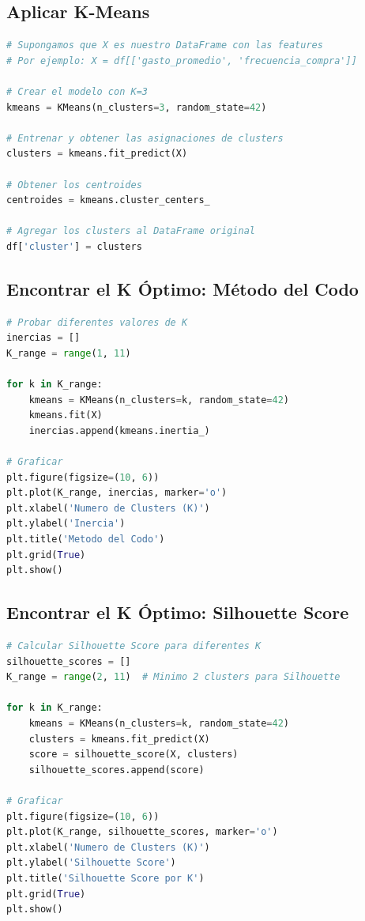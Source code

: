 \documentclass[12pt]{article}
\begin{document}
\subsection{Aplicar K-Means}

\begin{lstlisting}[language=Python]
# Supongamos que X es nuestro DataFrame con las features
# Por ejemplo: X = df[['gasto_promedio', 'frecuencia_compra']]

# Crear el modelo con K=3
kmeans = KMeans(n_clusters=3, random_state=42)

# Entrenar y obtener las asignaciones de clusters
clusters = kmeans.fit_predict(X)

# Obtener los centroides
centroides = kmeans.cluster_centers_

# Agregar los clusters al DataFrame original
df['cluster'] = clusters
\end{lstlisting}

\subsection{Encontrar el K Óptimo: Método del Codo}

\begin{lstlisting}[language=Python]
# Probar diferentes valores de K
inercias = []
K_range = range(1, 11)

for k in K_range:
    kmeans = KMeans(n_clusters=k, random_state=42)
    kmeans.fit(X)
    inercias.append(kmeans.inertia_)

# Graficar
plt.figure(figsize=(10, 6))
plt.plot(K_range, inercias, marker='o')
plt.xlabel('Numero de Clusters (K)')
plt.ylabel('Inercia')
plt.title('Metodo del Codo')
plt.grid(True)
plt.show()
\end{lstlisting}

\subsection{Encontrar el K Óptimo: Silhouette Score}

\begin{lstlisting}[language=Python]
# Calcular Silhouette Score para diferentes K
silhouette_scores = []
K_range = range(2, 11)  # Minimo 2 clusters para Silhouette

for k in K_range:
    kmeans = KMeans(n_clusters=k, random_state=42)
    clusters = kmeans.fit_predict(X)
    score = silhouette_score(X, clusters)
    silhouette_scores.append(score)

# Graficar
plt.figure(figsize=(10, 6))
plt.plot(K_range, silhouette_scores, marker='o')
plt.xlabel('Numero de Clusters (K)')
plt.ylabel('Silhouette Score')
plt.title('Silhouette Score por K')
plt.grid(True)
plt.show()
\end{lstlisting}
\end{document}
